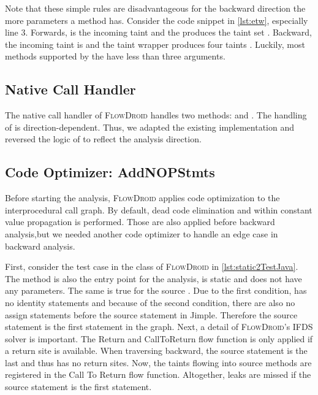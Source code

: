 \documentclass[../draft.tex]{subfiles}
\begin{document}
    Note that these simple rules are disadvantageous for the backward direction the more parameters a method has.
    Consider the code snippet in \autoref{lst:etw}, especially line 3.
    Forwards,  is the incoming taint and the  produces the taint set .
    Backward, the incoming taint is  and the taint wrapper produces four taints .
    Luckily, most methods supported by the  have less than three arguments.

    \subsection{Native Call Handler}
    The native call handler of \textsc{FlowDroid} handles two methods:  and .
    The handling of  is direction-dependent.
    Thus, we adapted the existing implementation and reversed the logic of  to reflect the analysis direction.

    \subsection{Code Optimizer: AddNOPStmts}
    Before starting the analysis, \textsc{FlowDroid} applies code optimization to the interprocedural call graph.
    By default, dead code elimination and within constant value propagation is performed.
    Those are also applied before backward analysis,but we needed another code optimizer to handle an edge case in backward analysis.

    First, consider the  test case in the  class of \textsc{FlowDroid} in \autoref{lst:static2TestJava}.
    The method is also the entry point for the analysis, is static and does not have any parameters.
    The same is true for the source .
    Due to the first condition,  has no identity statements and because of the second condition, there are also no assign statements before the source statement in Jimple.
    Therefore the source statement is the first statement in the graph.
    Next, a detail of \textsc{FlowDroid}'s IFDS solver is important.
    The Return and CallToReturn flow function is only applied if a return site is available.
    When traversing backward, the source statement is the last and thus has no return sites.
    Now, the taints flowing into source methods are registered in the Call To Return flow function.
    Altogether, leaks are missed if the source statement is the first statement.
\end{document}
